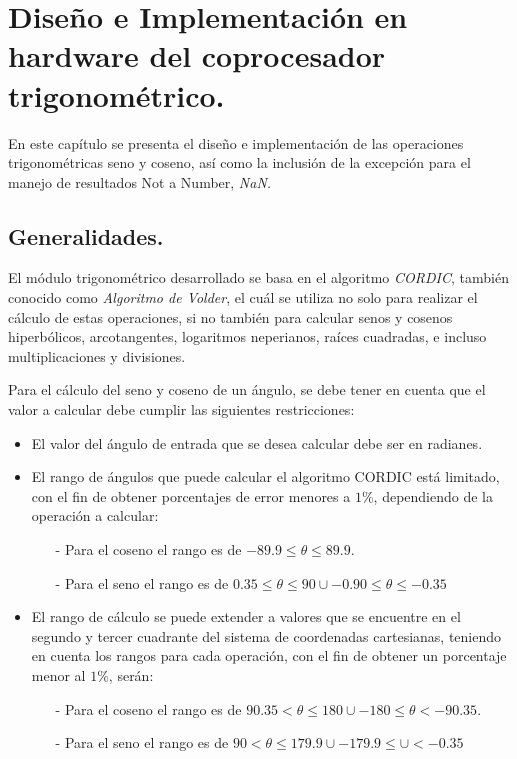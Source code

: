 \chapter{Diseño e Implementación en hardware del coprocesador trigonométrico.}
\label{ch:solucion}

En este capítulo se presenta el diseño e implementación de las operaciones trigonométricas seno y coseno, así como la inclusión de la excepción para el manejo de resultados Not a Number, \textit{NaN.}

\section{Generalidades.}
El módulo trigonométrico desarrollado se basa en el algoritmo \textit{CORDIC}, también conocido como \textit{Algoritmo de Volder}, el cuál se utiliza no solo para realizar el cálculo de estas operaciones, si no también para calcular senos y cosenos hiperbólicos, arcotangentes, logaritmos neperianos, raíces cuadradas, e incluso multiplicaciones y divisiones.

Para el cálculo del seno y coseno de un ángulo, se debe tener en cuenta que el valor a calcular debe cumplir las siguientes restricciones:
\begin{itemize}
\item	El valor del ángulo de entrada que se desea calcular debe ser en radianes.
\item	El rango de ángulos que puede calcular el algoritmo CORDIC está limitado, con el fin de obtener porcentajes de error menores a $1\%$, dependiendo de la operación a calcular:
	\begin{itemize}
	\item[-]		Para el coseno el rango es de $-89.9 \leqslant \theta \leqslant 89.9 $.
	\item[-]		Para el seno el rango es de $0.35 \leqslant \theta \leqslant 90 \cup -0.90 \leqslant \theta \leqslant -0.35 $
	\end{itemize}
\item	El rango de cálculo se puede extender a valores que se encuentre en el segundo y tercer cuadrante del sistema de coordenadas cartesianas, teniendo en cuenta los rangos para cada operación, con el fin de obtener un porcentaje menor al $1\%$, serán:
	\begin{itemize}
	\item[-]		Para el coseno el rango es de $90.35 < \theta \leqslant 180 \cup -180 \leqslant \theta < -90.35$.
	\item[-]		Para el seno el rango es de $ 90 < \theta \leqslant 179.9 \cup -179.9 \leqslant \cup < -0.35 $
	\end{itemize}
\end{itemize}


